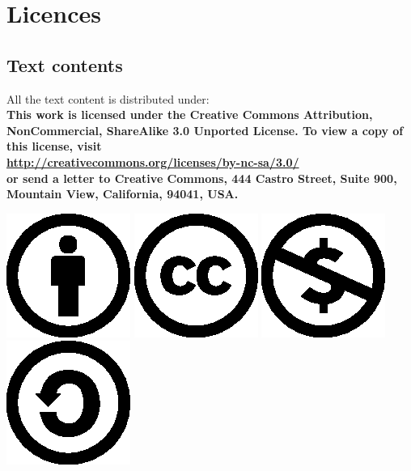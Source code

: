 \newpage

\section*{Licences}

\subsection*{Text contents}
All the text content is distributed under:\\
\textbf{ This work is licensed under the Creative Commons Attribution,
  NonCommercial, ShareAlike 3.0 Unported License. To view a
  copy of this license, visit\\
  \href{http://creativecommons.org/licenses/by-nc-sa/3.0/}{http://creativecommons.org/licenses/by-nc-sa/3.0/}\\
  or send a letter to Creative Commons, 444 Castro Street, Suite 900,
  Mountain View, California, 94041, USA.}

\begin{center}
\includegraphics{cc-icons-eps/by}
\includegraphics{cc-icons-eps/cc}
\includegraphics{cc-icons-eps/nc}
\includegraphics{cc-icons-eps/sa}
\end{center}

